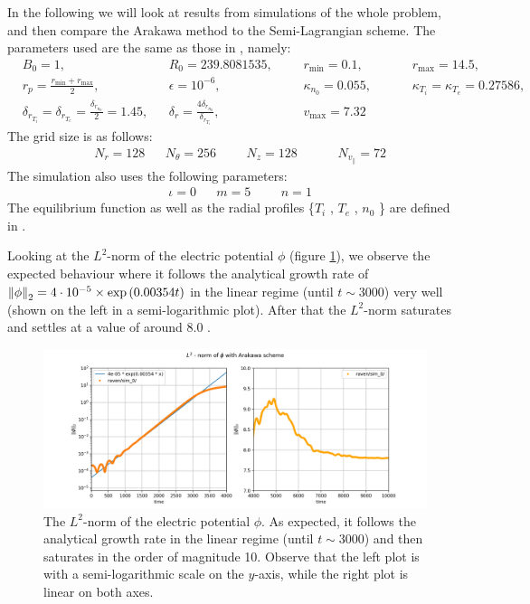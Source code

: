 In the following we will look at results from simulations of the whole problem, and then compare the Arakawa method to the Semi-Lagrangian scheme.  The parameters used are the same as those in \cite{Latu_2017}, namely:
\begin{align*}
	& B_0=1, && R_0 = 239.8081535, &&& r_{\min}=0.1, &&&& r_{\max}=14.5,\\
	& r_p = \frac{r_{\min}+r_{\max}}{2}, && \epsilon = 10^{-6}, &&& \kappa_{n_0}=0.055, &&&& \kappa_{T_i}=\kappa_{T_e}=0.27586,\\
	& \delta_{r_{T_i}}=\delta_{r_{T_e}}=\frac{\delta_{r_{n_0}}}{2} = 1.45, && \delta_r = \frac{4\delta_{r_{n_0}}}{\delta_{r_{T_i}}}, &&& v_{\max}=7.32 
\end{align*}
The grid size is as follows:
\begin{align*}
	& N_r = 128 && N_\theta = 256 &&& N_z = 128 &&&& N_{v_\parallel} = 72
\end{align*}
The simulation also uses the following parameters:
\begin{align*}
	&\iota=0 && m=5 &&& n=1
\end{align*}
The equilibrium function as well as the radial profiles \{$T_i$ , $T_e$ , $n_0$ \} are defined in \cite{Latu_2017}.

Looking at the $L^2$-norm of the electric potential $\phi$ (figure \ref{fig:l2phi}), we observe the expected behaviour where it follows the analytical growth rate of $\norm{\phi}_2 = 4\cdot 10^{-5} \times \exp\left(0.00354 t\right)$ in the linear regime (until $t \sim 3000$) very well (shown on the left in a semi-logarithmic plot). After that the $L^2$-norm saturates and settles at a value of around $8.0$ .

\begin{figure}
	\centering
	\includegraphics[width=\linewidth]{plots/L2phi}
	\caption{The $L^2$-norm of the electric potential $\phi$. As expected, it follows the analytical growth rate in the linear regime (until $t\sim 3000$) and then saturates in the order of magnitude 10. Observe that the left plot is with a semi-logarithmic scale on the $y$-axis, while the right plot is linear on both axes.}
	\label{fig:l2phi}
\end{figure}


